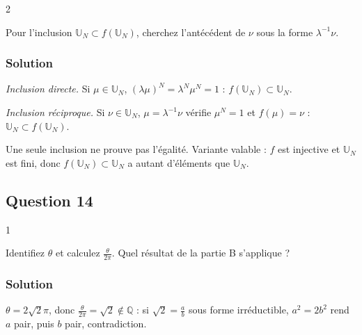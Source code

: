 \documentclass[11pt,a4paper]{article}
\newcommand{\equationajustee}[1]{%
  \sbox{\boiteequation}{$\displaystyle #1$}%
  \ifdim\wd\boiteequation>\linewidth
    \[\resizebox{\linewidth}{!}{\usebox{\boiteequation}}\]%
  \else
    \[#1\]%
  \fi}
\begin{document}
\begin{indication}{2}

Pour l'inclusion \({\mathbb{U}}_N\subset f({\mathbb{U}}_N)\), cherchez l'antécédent de \(\nu\) sous la forme \(\lambda^{-1}\nu\).

\end{indication}

\hypertarget{solution-56}{%
\subsubsection{Solution}\label{solution-56}}

\emph{Inclusion directe.} Si \(\mu\in{\mathbb{U}}_N\), \((\lambda\mu)^N=\lambda^N\mu^N=1\) : \(f({\mathbb{U}}_N)\subset{\mathbb{U}}_N\).

\emph{Inclusion réciproque.} Si \(\nu\in{\mathbb{U}}_N\), \(\mu=\lambda^{-1}\nu\) vérifie \(\mu^N=1\) et \(f(\mu)=\nu\) : \({\mathbb{U}}_N\subset f({\mathbb{U}}_N)\).

\equationajustee{\boxed{f({\mathbb{U}}_N)={\mathbb{U}}_N.}}

\begin{piege}

Une seule inclusion ne prouve pas l'égalité. Variante valable : \(f\) est injective et \({\mathbb{U}}_N\) est fini, donc \(f({\mathbb{U}}_N)\subset{\mathbb{U}}_N\) a autant d'éléments que \({\mathbb{U}}_N\).

\end{piege}

\hypertarget{question-14}{%
\subsection{Question 14}\label{question-14}}

\begin{indication}{1}

Identifiez \(\theta\) et calculez \(\frac\theta{2\pi}\). Quel résultat de la partie B s'applique ?

\end{indication}

\hypertarget{solution-57}{%
\subsubsection{Solution}\label{solution-57}}

\(\theta=2\sqrt2\pi\), donc \(\frac\theta{2\pi}=\sqrt2\notin\mathbb{Q}\) : si \(\sqrt2=\frac ab\) sous forme irréductible, \(a^2=2b^2\) rend \(a\) pair, puis \(b\) pair, contradiction.
\end{document}
